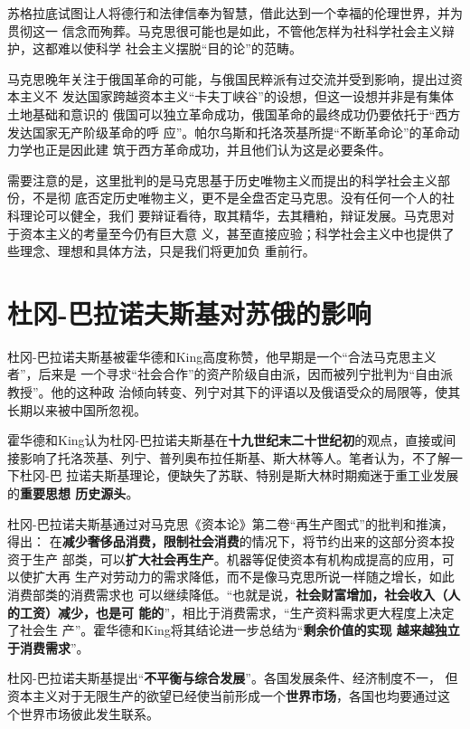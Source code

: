 苏格拉底试图让人将德行和法律信奉为智慧，借此达到一个幸福的伦理世界，并为贯彻这一
信念而殉葬。马克思很可能也是如此，不管他怎样为社科学社会主义辩护，这都难以使科学
社会主义摆脱``目的论''的范畴。

马克思晚年关注于俄国革命的可能，与俄国民粹派有过交流并受到影响，提出过资本主义不
发达国家跨越资本主义``卡夫丁峡谷''的设想，但这一设想并非是有集体土地基础和意识的
俄国可以独立革命成功，俄国革命的最终成功仍要依托于``西方发达国家无产阶级革命的呼
应''。\cite{mamincui}帕尔乌斯和托洛茨基所提“不断革命论”的革命动力学也正是因此建
筑于西方革命成功，并且他们认为这是必要条件。

需要注意的是，这里批判的是马克思基于历史唯物主义而提出的科学社会主义部份，不是彻
底否定历史唯物主义，更不是全盘否定马克思。没有任何一个人的社科理论可以健全，我们
要辩证看待，取其精华，去其糟粕，辩证发展。马克思对于资本主义的考量至今仍有巨大意
义，甚至直接应验；科学社会主义中也提供了些理念、理想和具体方法，只是我们将更加负
重前行。

\section{杜冈-巴拉诺夫斯基对苏俄的影响}

杜冈-巴拉诺夫斯基被霍华德和King高度称赞，他早期是一个“合法马克思主义者”，后来是
一个寻求“社会合作”的资产阶级自由派，因而被列宁批判为“自由派教授”。他的这种政
治倾向转变、列宁对其下的评语以及俄语受众的局限等，使其长期以来被中国所忽视。

霍华德和King认为杜冈-巴拉诺夫斯基在\textbf{十九世纪末二十世纪初}的观点，直接或间
接影响了托洛茨基、列宁、普列奥布拉任斯基、斯大林等人。笔者认为，不了解一下杜冈-巴
拉诺夫斯基理论，便缺失了苏联、特别是斯大林时期痴迷于重工业发展的\textbf{重要思想
  历史源头}。

杜冈-巴拉诺夫斯基通过对马克思《资本论》第二卷“再生产图式”的批判和推演，得出：
在\textbf{减少奢侈品消费，限制社会消费}的情况下，将节约出来的这部分资本投资于生产
部类，可以\textbf{扩大社会再生产}。机器等促使资本有机构成提高的应用，可以使扩大再
生产对劳动力的需求降低，而不是像马克思所说一样随之增长，如此消费部类的消费需求也
可以继续降低。“也就是说，\textbf{社会财富增加，社会收入（人的工资）减少，也是可
  能的}”，相比于消费需求，“生产资料需求更大程度上决定了社会生
产”。\cite{lijingdugang}霍华德和King将其结论进一步总结为“\textbf{剩余价值的实现
  越来越独立于消费需求}”。

杜冈-巴拉诺夫斯基提出“\textbf{不平衡与综合发展}”。各国发展条件、经济制度不一，
但资本主义对于无限生产的欲望已经使当前形成一个\textbf{世界市场}，各国也均要通过这
个世界市场彼此发生联系。

